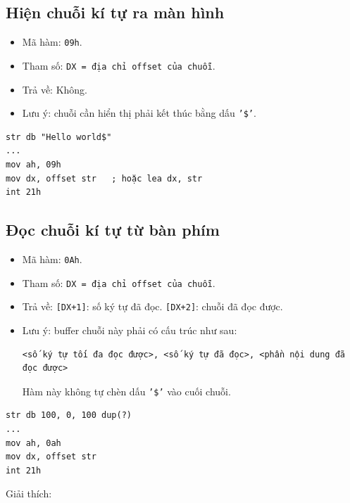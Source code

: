\documentclass[12pt]{report}
\newcommand{\code}[1]{\texttt{#1}}
\begin{document}
\subsection*{Hiện chuỗi kí tự ra màn hình}
\begin{itemize}
    \item Mã hàm: \code{09h}.
    \item Tham số: \code{DX = địa chỉ offset của chuỗi}.
    \item Trả về: Không.
    \item Lưu ý: chuỗi cần hiển thị phải kết thúc bằng dấu \code{'\$'}.
\end{itemize}
\begin{verbatim}
str db "Hello world$"
... 
mov ah, 09h 
mov dx, offset str   ; hoặc lea dx, str
int 21h
\end{verbatim}
\subsection*{Đọc chuỗi kí tự từ bàn phím}
\begin{itemize}
    \item Mã hàm: \code{0Ah}.
    \item Tham số: \code{DX = địa chỉ offset của chuỗi}.
    \item Trả về: \code{[DX+1]}: số ký tự đã đọc. \code{[DX+2]}: chuỗi đã đọc được.
    \item Lưu ý: buffer chuỗi này phải có cấu trúc như sau:
    \begin{verbatim}
<số ký tự tối đa đọc được>, <số ký tự đã đọc>, <phần nội dung đã đọc được>
    \end{verbatim}
    \par Hàm này không tự chèn dấu \code{'\$'} vào cuối chuỗi.
\end{itemize}
\begin{verbatim}
str db 100, 0, 100 dup(?)
...
mov ah, 0ah 
mov dx, offset str 
int 21h
\end{verbatim}
Giải thích:
\end{document}
